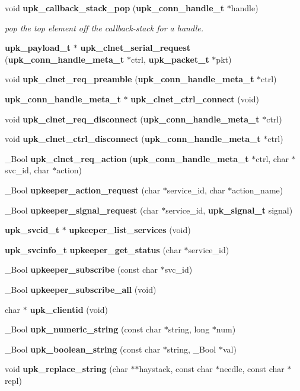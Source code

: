 \begin{DoxyCompactItemize}
void {\bf upk\_\-callback\_\-stack\_\-pop} ({\bf upk\_\-conn\_\-handle\_\-t} $\ast$handle)
\begin{DoxyCompactList}\small\item\em pop the top element off the callback-\/stack for a handle. \end{DoxyCompactList}\item 
{\bf upk\_\-payload\_\-t} $\ast$ {\bf upk\_\-clnet\_\-serial\_\-request} ({\bf upk\_\-conn\_\-handle\_\-meta\_\-t} $\ast$ctrl, {\bf upk\_\-packet\_\-t} $\ast$pkt)
\item 
void {\bf upk\_\-clnet\_\-req\_\-preamble} ({\bf upk\_\-conn\_\-handle\_\-meta\_\-t} $\ast$ctrl)
\item 
{\bf upk\_\-conn\_\-handle\_\-meta\_\-t} $\ast$ {\bf upk\_\-clnet\_\-ctrl\_\-connect} (void)
\item 
void {\bf upk\_\-clnet\_\-req\_\-disconnect} ({\bf upk\_\-conn\_\-handle\_\-meta\_\-t} $\ast$ctrl)
\item 
void {\bf upk\_\-clnet\_\-ctrl\_\-disconnect} ({\bf upk\_\-conn\_\-handle\_\-meta\_\-t} $\ast$ctrl)
\item 
\_\-Bool {\bf upk\_\-clnet\_\-req\_\-action} ({\bf upk\_\-conn\_\-handle\_\-meta\_\-t} $\ast$ctrl, char $\ast$svc\_\-id, char $\ast$action)
\item 
\_\-Bool {\bf upkeeper\_\-action\_\-request} (char $\ast$service\_\-id, char $\ast$action\_\-name)
\item 
\_\-Bool {\bf upkeeper\_\-signal\_\-request} (char $\ast$service\_\-id, {\bf upk\_\-signal\_\-t} signal)
\item 
{\bf upk\_\-svcid\_\-t} $\ast$ {\bf upkeeper\_\-list\_\-services} (void)
\item 
{\bf upk\_\-svcinfo\_\-t} {\bf upkeeper\_\-get\_\-status} (char $\ast$service\_\-id)
\item 
\_\-Bool {\bf upkeeper\_\-subscribe} (const char $\ast$svc\_\-id)
\item 
\_\-Bool {\bf upkeeper\_\-subscribe\_\-all} (void)
\item 
char $\ast$ {\bf upk\_\-clientid} (void)
\item 
\_\-Bool {\bf upk\_\-numeric\_\-string} (const char $\ast$string, long $\ast$num)
\item 
\_\-Bool {\bf upk\_\-boolean\_\-string} (const char $\ast$string, \_\-Bool $\ast$val)
\item 
void {\bf upk\_\-replace\_\-string} (char $\ast$$\ast$haystack, const char $\ast$needle, const char $\ast$repl)
\item 
$$
\end{DoxyCompactItemize}
